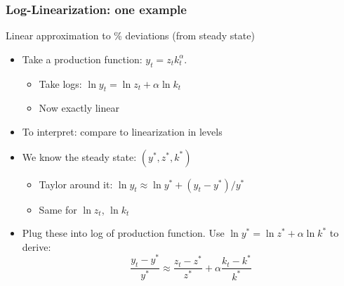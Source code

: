 \documentclass[bigger]{beamer}
\begin{document}
\begin{frame}%
\frametitle{Log-Linearization: one example}

Linear approximation to \% deviations (from steady state)

\begin{itemize}
\item Take a production function: $y_{t}=z_{t}k_{t}^{\alpha }$.

\begin{itemize}
\item Take logs: $\ln y_{t}=\ln z_{t}+\alpha \ln k_{t}$
\item Now exactly linear
\end{itemize}

\item To interpret: compare to linearization in levels

\item We know the steady state: $\left( y^{\ast },z^{\ast },k^{\ast }\right) 
$

\begin{itemize}
\item Taylor around it: $\ln y_{t}\approx \ln y^{\ast }+\left( y_{t}-y^{\ast
}\right) /y^{\ast }$

\item Same for $\ln z_{t}$, $\ln k_{t}$
\end{itemize}

\item Plug these into log of production function.\newline
Use $\ln y^{\ast }=\ln z^{\ast }+\alpha \ln k^{\ast }$ to derive:%
\begin{equation*}
\frac{y_{t}-y^{\ast }}{y^{\ast }}\approx \frac{z_{t}-z^{\ast }}{z^{\ast }}%
+\alpha \frac{k_{t}-k^{\ast }}{k^{\ast }}
\end{equation*}
\end{itemize}

\end{frame}%
\end{document}
